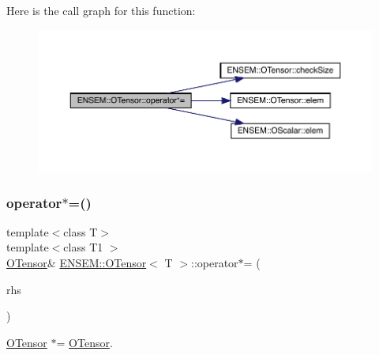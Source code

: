 Here is the call graph for this function\+:
\nopagebreak
\begin{figure}[H]
\begin{center}
\leavevmode
\includegraphics[width=350pt]{da/d8a/classENSEM_1_1OTensor_a0326883980545068700bbdd762df5904_cgraph}
\end{center}
\end{figure}
\mbox{\label{classENSEM_1_1OTensor_a6edba72b265fa3629417ad85c9ae1477}} 
\subsubsection{\texorpdfstring{operator$\ast$=()}{operator*=()}\hspace{0.1cm}{\footnotesize\ttfamily [4/6]}}
{\footnotesize\ttfamily template$<$class T$>$ \\
template$<$class T1 $>$ \\
\mbox{\hyperlink{classENSEM_1_1OTensor}{O\+Tensor}}\& \mbox{\hyperlink{classENSEM_1_1OTensor}{E\+N\+S\+E\+M\+::\+O\+Tensor}}$<$ T $>$\+::operator$\ast$= (\begin{DoxyParamCaption}\item[{const \mbox{\hyperlink{classENSEM_1_1OTensor}{O\+Tensor}}$<$ T1 $>$ \&}]{rhs }\end{DoxyParamCaption})\hspace{0.3cm}{\ttfamily [inline]}}



\mbox{\hyperlink{classENSEM_1_1OTensor}{O\+Tensor}} $\ast$= \mbox{\hyperlink{classENSEM_1_1OTensor}{O\+Tensor}}. 

